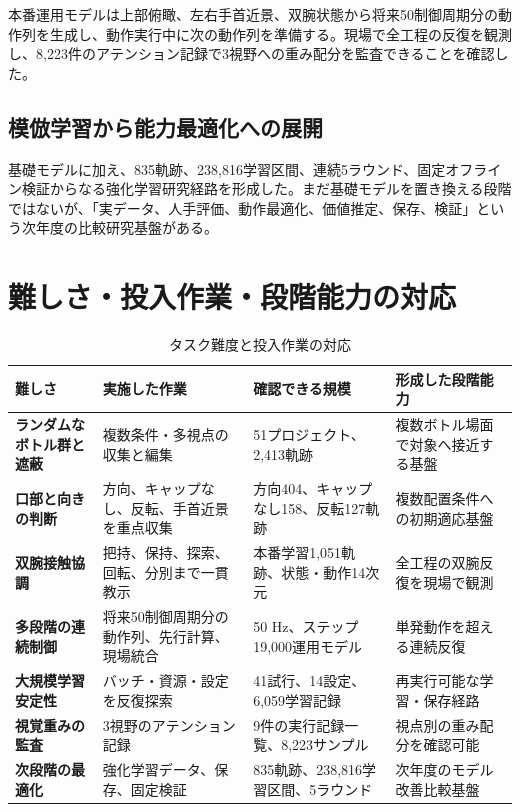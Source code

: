 本番運用モデルは上部俯瞰、左右手首近景、双腕状態から将来50制御周期分の動作列を生成し、動作実行中に次の動作列を準備する。現場で全工程の反復を観測し、8,223件のアテンション記録で3視野への重み配分を監査できることを確認した。

\subsection{模倣学習から能力最適化への展開}

基礎モデルに加え、835軌跡、238,816学習区間、連続5ラウンド、固定オフライン検証からなる強化学習研究経路を形成した。まだ基礎モデルを置き換える段階ではないが、「実データ、人手評価、動作最適化、価値推定、保存、検証」という次年度の比較研究基盤がある。

\section{難しさ・投入作業・段階能力の対応}

\begin{table}[H]
\centering
\caption{タスク難度と投入作業の対応}
\small
\begin{tabularx}{\textwidth}{>{\bfseries}p{25mm}p{38mm}p{36mm}X}
\toprule
難しさ & 実施した作業 & 確認できる規模 & 形成した段階能力\\
\midrule
ランダムなボトル群と遮蔽 & 複数条件・多視点の収集と編集 & 51プロジェクト、2,413軌跡 & 複数ボトル場面で対象へ接近する基盤\\
口部と向きの判断 & 方向、キャップなし、反転、手首近景を重点収集 & 方向404、キャップなし158、反転127軌跡 & 複数配置条件への初期適応基盤\\
双腕接触協調 & 把持、保持、探索、回転、分別まで一貫教示 & 本番学習1,051軌跡、状態・動作14次元 & 全工程の双腕反復を現場で観測\\
多段階の連続制御 & 将来50制御周期分の動作列、先行計算、現場統合 & 50 Hz、ステップ19,000運用モデル & 単発動作を超える連続反復\\
大規模学習安定性 & バッチ・資源・設定を反復探索 & 41試行、14設定、6,059学習記録 & 再実行可能な学習・保存経路\\
視覚重みの監査 & 3視野のアテンション記録 & 9件の実行記録一覧、8,223サンプル & 視点別の重み配分を確認可能\\
次段階の最適化 & 強化学習データ、保存、固定検証 & 835軌跡、238,816学習区間、5ラウンド & 次年度のモデル改善比較基盤\\
\bottomrule
\end{tabularx}
\end{table}

